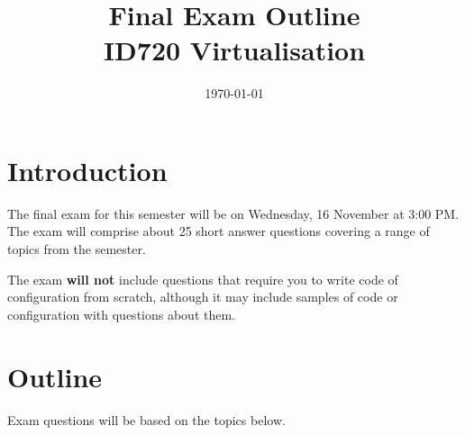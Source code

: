 \documentclass{article}
\begin{document}
\title{Final Exam Outline \\ ID720 Virtualisation}
\date{\today}
\maketitle

\section*{Introduction}
The final exam for this semester will be on Wednesday, 16 November at 3:00 PM. The exam will comprise about 25 short answer questions covering a range of topics from the semester.

The exam \textbf{will not} include questions that require you to write code of configuration from scratch, although it may include samples of code or configuration with questions about them.

\section*{Outline}
Exam questions will be based on the topics below.
\end{document}
